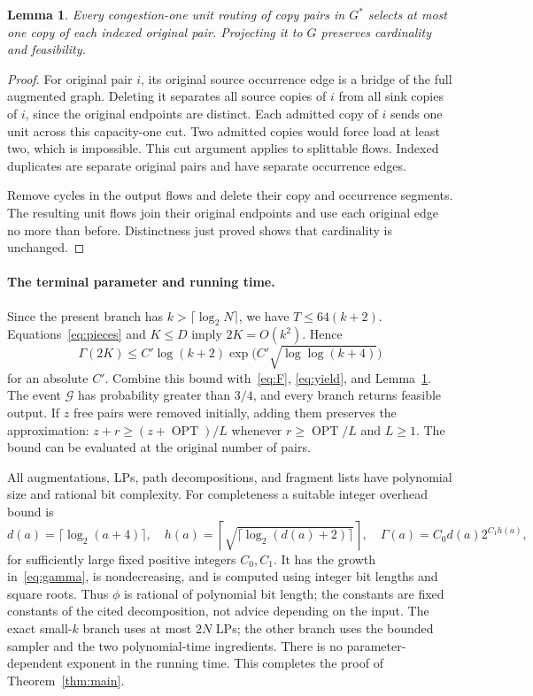 \documentclass[acmsmall,11pt,screen,nonacm]{acmart}
\newtheorem{lemma}[theorem]{Lemma}
\newcommand{\OPT}{\operatorname{OPT}}
\begin{document}
\begin{lemma}\label{lem:distinct}
Every congestion-one unit routing of copy pairs in $G^*$ selects at most
one copy of each indexed original pair. Projecting it to $G$ preserves
cardinality and feasibility.
\end{lemma}
\begin{proof}
For original pair $i$, its original source occurrence edge is a bridge of
the full augmented graph. Deleting it separates all source copies of $i$
from all sink copies of $i$, since the original endpoints are distinct.
Each admitted copy of $i$ sends one unit across this capacity-one cut.
Two admitted copies would force load at least two, which is impossible.
This cut argument applies to splittable flows. Indexed duplicates are
separate original pairs and have separate occurrence edges.

Remove cycles in the output flows and delete their copy and occurrence
segments. The resulting unit flows join their original endpoints and
use each original edge no more than before. Distinctness just proved
shows that cardinality is unchanged.
\end{proof}

\paragraph{The terminal parameter and running time.}
Since the present branch has $k>\lceil\log_2N\rceil$, we have
$T\le64(k+2)$. Equations~\eqref{eq:pieces} and $K\le D$ imply
$2K=O(k^2)$. Hence
\[
 \Gamma(2K)\le C'\log(k+2)
       \exp\!\bigl(C'\sqrt{\log\log(k+4)}\bigr)
\]
for an absolute $C'$. Combine this bound with~\eqref{eq:F},
\eqref{eq:yield}, and Lemma~\ref{lem:distinct}. The event $\mathcal G$ has
probability greater than $3/4$, and every branch returns feasible output.
If $z$ free pairs were removed initially, adding them preserves the
approximation: $z+r\ge(z+\OPT)/L$ whenever $r\ge\OPT/L$ and $L\ge1$.
The bound can be evaluated at the original number of pairs.

All augmentations, LPs, path decompositions, and fragment lists have
polynomial size and rational bit complexity. For completeness a suitable
integer overhead bound is
\[
 d(a)=\lceil\log_2(a+4)\rceil,\quad
 h(a)=\left\lceil\sqrt{\lceil\log_2(d(a)+2)\rceil}\right\rceil,\quad
 \Gamma(a)=C_0d(a)2^{C_1h(a)},
\]
for sufficiently large fixed positive integers $C_0,C_1$. It has the growth
in~\eqref{eq:gamma}, is nondecreasing, and is computed using integer bit
lengths and square roots. Thus $\phi$ is rational of polynomial bit length;
the constants are fixed constants of the cited decomposition, not advice
depending on the input. The exact small-$k$ branch uses at most $2N$ LPs;
the other branch uses the bounded sampler and the two polynomial-time
ingredients. There is no parameter-dependent exponent in the running time.
This completes the proof of Theorem~\ref{thm:main}.
\end{document}
